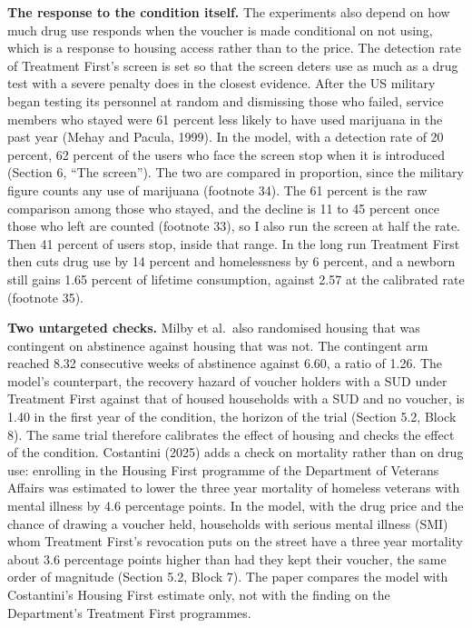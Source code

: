 \documentclass[11pt]{article}
\begin{document}
\begin{response}
\textbf{The response to the condition itself.} The experiments also depend on how much drug
use responds when the voucher is made conditional on not using, which is a response to
housing access rather than to the price. The detection rate of Treatment First's screen is
set so that the screen deters use as much as a drug test with a severe penalty does in the
closest evidence. After the US military began testing its personnel at random and
dismissing those who failed, service members who stayed were 61 percent less likely to have
used marijuana in the past year (Mehay and Pacula, 1999). In the model, with a detection
rate of 20 percent, 62 percent of the users who face the screen stop when it is introduced
(Section 6, ``The screen''). The two are compared in proportion, since the military figure
counts any use of marijuana (footnote 34). The 61 percent is the raw comparison among those
who stayed, and the decline is 11 to 45 percent once those who left are counted (footnote
33), so I also run the screen at half the rate. Then 41 percent of users stop, inside that
range. In the long run Treatment First then cuts drug use by 14 percent and homelessness by
6 percent, and a newborn still gains 1.65 percent of lifetime consumption, against 2.57 at
the calibrated rate (footnote 35).

\textbf{Two untargeted checks.} Milby et al.\ also randomised housing that was contingent on
abstinence against housing that was not. The contingent arm reached 8.32 consecutive weeks
of abstinence against 6.60, a ratio of 1.26. The model's counterpart, the recovery hazard of
voucher holders with a SUD under Treatment First against that of housed households with a
SUD and no voucher, is 1.40 in the first year of the condition, the horizon of the trial
(Section 5.2, Block 8). The same trial therefore calibrates the effect of housing and checks
the effect of the condition. Costantini (2025) adds a check on mortality rather than on
drug use: enrolling in the Housing First programme of the Department of Veterans Affairs was
estimated to lower the three year mortality of homeless veterans with mental illness by 4.6
percentage points. In the model, with the drug price and the chance of drawing a voucher
held, households with serious mental illness (SMI) whom Treatment First's revocation puts on
the street have a three year mortality about 3.6 percentage points higher than had they kept
their voucher, the same order of magnitude (Section 5.2, Block 7). The paper compares the model with Costantini's Housing First estimate only, not with the finding on the Department's
Treatment First programmes.


\end{response}
\end{document}
